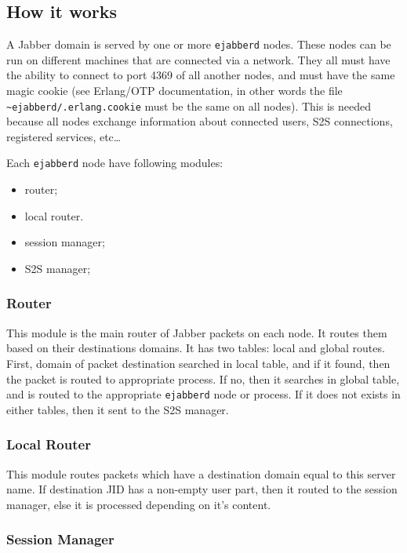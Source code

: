 \documentclass[10pt]{article}
\newcommand{\ejabberd}{\texttt{ejabberd}}
\newcommand{\Jabber}{Jabber}
\begin{document}
\subsection{How it works}
\label{sec:howitworks}



A \Jabber{} domain is served by one or more \ejabberd{} nodes.  These nodes can
be run on different machines that are connected via a network.  They all must
have the ability to connect to port 4369 of all another nodes, and must have
the same magic cookie (see Erlang/OTP documentation, in other words the file
\texttt{\~{}ejabberd/.erlang.cookie} must be the same on all nodes). This is
needed because all nodes exchange information about connected users, S2S
connections, registered services, etc\ldots



Each \ejabberd{} node have following modules:
\begin{itemize}
\item router;
\item local router.
\item session manager;
\item S2S manager;
\end{itemize}


\subsubsection{Router}

This module is the main router of \Jabber{} packets on each node.  It routes
them based on their destinations domains.  It has two tables: local and global
routes.  First, domain of packet destination searched in local table, and if it
found, then the packet is routed to appropriate process.  If no, then it
searches in global table, and is routed to the appropriate \ejabberd{} node or
process.  If it does not exists in either tables, then it sent to the S2S
manager.


\subsubsection{Local Router}

This module routes packets which have a destination domain equal to this server
name.  If destination JID has a non-empty user part, then it routed to the
session manager, else it is processed depending on it's content.


\subsubsection{Session Manager}
\end{document}
